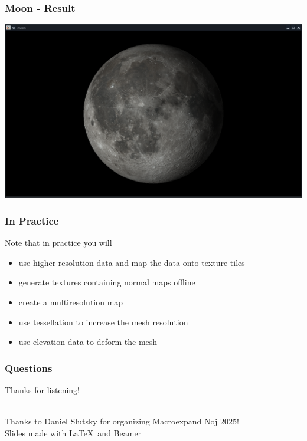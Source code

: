 \documentclass[aspectratio=169,11pt,xcolor=dvipsnames]{beamer}
\begin{document}
\begin{frame}
  \frametitle{Moon {-} Result}
  \begin{center}
    \includegraphics[width=.8\textwidth]{moon}
  \end{center}
\end{frame}

\begin{frame}
  \frametitle{In Practice}
  Note that in practice you will
  \begin{itemize}
    \item use higher resolution data and map the data onto texture tiles
    \item generate textures containing normal maps offline
    \item create a multiresolution map
    \item use tessellation to increase the mesh resolution
    \item use elevation data to deform the mesh
  \end{itemize}
\end{frame}

\begin{frame}
  \frametitle{Questions}
  \begin{center}
    \begin{huge}
      Thanks for listening!
    \end{huge}\\
    \vspace{24pt}
    Thanks to Daniel Slutsky for organizing Macroexpand Noj 2025!\\
    \vspace{24pt}
    Slides made with \LaTeX~and Beamer
  \end{center}
\end{frame}
\end{document}
